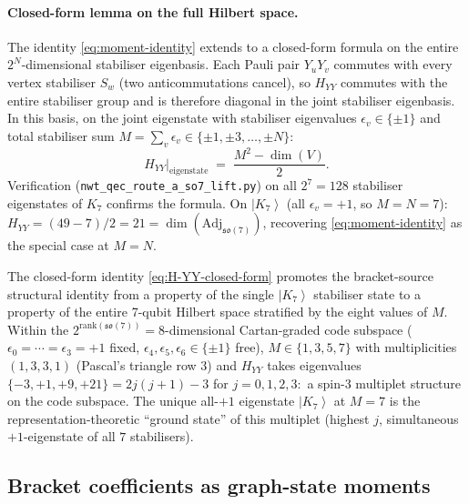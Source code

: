 \documentclass[11pt]{article}
\newcommand{\so}{\mathfrak{so}}
\newcommand{\Adj}{\mathrm{Adj}}
\newcommand{\ket}[1]{\left|#1\right\rangle}
\newcommand{\rank}{\mathrm{rank}}
\begin{document}
\paragraph{Closed-form lemma on the full Hilbert space.}
The identity \eqref{eq:moment-identity} extends to a closed-form
formula on the entire $2^N$-dimensional stabiliser eigenbasis.
Each Pauli pair $Y_u Y_v$ commutes with every vertex stabiliser $S_w$
(two anticommutations cancel), so $H_{YY}$ commutes with the entire
stabiliser group and is therefore diagonal in the joint stabiliser
eigenbasis.  In this basis, on the joint eigenstate with stabiliser
eigenvalues $\epsilon_v \in \{\pm 1\}$ and total stabiliser sum
$M = \sum_v \epsilon_v \in \{\pm 1, \pm 3, \ldots, \pm N\}$:
\begin{equation}
  \boxed{\quad
    H_{YY}\bigr|_{\text{eigenstate}}
    \;=\;
    \frac{M^2 - \dim(V)}{2}.
  \quad}
  \label{eq:H-YY-closed-form}
\end{equation}
Verification (\texttt{nwt\_qec\_route\_a\_so7\_lift.py}) on all
$2^7 = 128$ stabiliser eigenstates of $K_7$ confirms the formula.
On $\ket{K_7}$ (all $\epsilon_v = +1$, so $M = N = 7$):
$H_{YY} = (49 - 7)/2 = 21 = \dim(\Adj_{\so(7)})$, recovering
\eqref{eq:moment-identity} as the special case at $M = N$.

The closed-form identity \eqref{eq:H-YY-closed-form} promotes the
bracket-source structural identity from a property of the single
$\ket{K_7}$ stabiliser state to a property of the entire 7-qubit
Hilbert space stratified by the eight values of $M$.  Within the
$2^{\rank(\so(7))} = 8$-dimensional Cartan-graded code subspace
($\epsilon_0 = \cdots = \epsilon_3 = +1$ fixed,
$\epsilon_4, \epsilon_5, \epsilon_6 \in \{\pm 1\}$ free),
$M \in \{1, 3, 5, 7\}$ with multiplicities $(1, 3, 3, 1)$ (Pascal's
triangle row 3) and $H_{YY}$ takes eigenvalues
$\{-3, +1, +9, +21\} = 2j(j+1) - 3$ for $j = 0, 1, 2, 3$:\ a
spin-3 multiplet structure on the code subspace.  The unique
all-$+1$ eigenstate $\ket{K_7}$ at $M = 7$ is the
representation-theoretic ``ground state'' of this multiplet
(highest $j$, simultaneous $+1$-eigenstate of all $7$ stabilisers).

\subsection{Bracket coefficients as graph-state moments}
\label{sec:qec-bracket-from-moments}
\end{document}
